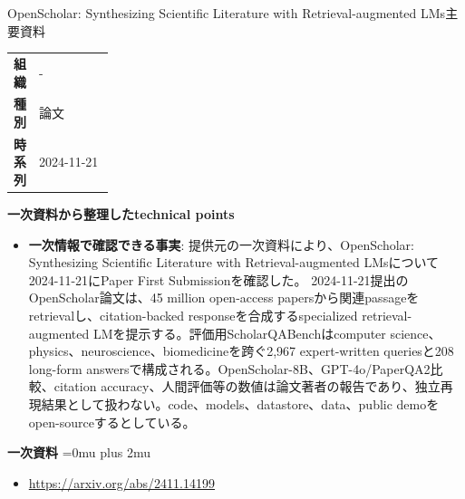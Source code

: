 \begin{technicalnote}{OpenScholar: Synthesizing Scientific Literature with Retrieval-augmented LMs}{主要資料}
\begingroup
\begin{tabularx}{\linewidth}{@{}>{\bfseries}p{0.22\linewidth}X@{}}
組織 & - \\
種別 & 論文 \\
時系列 & 2024-11-21 \\
\end{tabularx}
\smallskip
{\bfseries 一次資料から整理したtechnical points}
\begin{itemize}[leftmargin=1.5em,itemsep=0.35em]
\item \textbf{一次情報で確認できる事実}: 提供元の一次資料により、OpenScholar: Synthesizing Scientific Literature with Retrieval-augmented LMsについて2024-11-21にPaper First Submissionを確認した。 2024-11-21提出のOpenScholar論文は、45 million open-access papersから関連passageをretrievalし、citation-backed responseを合成するspecialized retrieval-augmented LMを提示する。評価用ScholarQABenchはcomputer science、physics、neuroscience、biomedicineを跨ぐ2,967 expert-written queriesと208 long-form answersで構成される。OpenScholar-8B、GPT-4o/PaperQA2比較、citation accuracy、人間評価等の数値は論文著者の報告であり、独立再現結果として扱わない。code、models、datastore、data、public demoをopen-sourceするとしている。
\end{itemize}
\begin{minipage}{\linewidth}
\begin{samepage}
{\bfseries 一次資料}
\begingroup\sloppy
\Urlmuskip=0mu plus 2mu\relax
\begin{itemize}[leftmargin=1.5em,itemsep=0.25em]
\item {\scriptsize\url{https://arxiv.org/abs/2411.14199}}
\end{itemize}
\endgroup
\end{samepage}
\end{minipage}
\endgroup
\end{technicalnote}
\medskip

